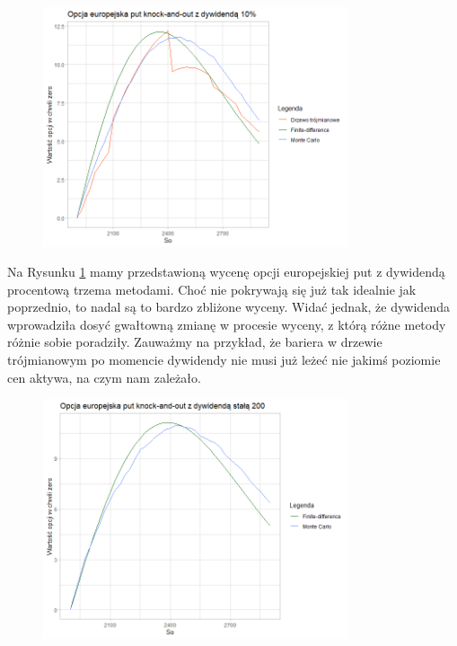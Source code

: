 \documentclass[12pt]{article}
\begin{document}
\begin{figure}[H]
    \centering
    \includegraphics[width=0.8\textwidth,height=\textheight,keepaspectratio]{dyw10proc.png}
    \caption{}
    \label{d10}
\end{figure}

Na Rysunku \ref{d10} mamy przedstawioną wycenę opcji europejskiej put z dywidendą procentową trzema metodami. Choć nie pokrywają się już tak idealnie jak poprzednio, to nadal są to bardzo zbliżone wyceny. Widać jednak, że dywidenda wprowadziła dosyć gwałtowną zmianę w procesie wyceny, z którą różne metody różnie sobie poradziły. Zauważmy na przykład, że bariera w drzewie trójmianowym po momencie dywidendy nie musi już leżeć nie jakimś poziomie cen aktywa, na czym nam zależało.

\begin{figure}[H]
    \centering
    \includegraphics[width=0.8\textwidth,height=\textheight,keepaspectratio]{dyw200.png}
    \caption{}
    \label{d200}
\end{figure}
\end{document}
